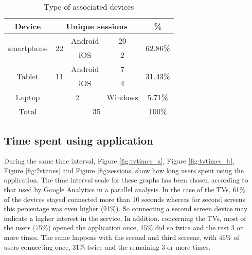 \begin{table}
	\begin{center}
		\caption{Type of associated devices}\label{tab:associated}
		\begin{tabular}{||c|c|c|c|c||}
			\hline
			\multicolumn{1}{||c|}{Device}                      & \multicolumn{3}{c|}{Unique sessions} & \%                       \\ \hline\hline
			\multicolumn{1}{||c|}{\multirow{2}{*}{smartphone}} & \multirow{2}{*}{22}    & Android   & 20        & \multirow{2}{*}{62.86\%} \\ \cline{3-4}
			\multicolumn{1}{||c|}{}                            &                        & iOS       & 2         &                          \\ \hline
			\multirow{2}{*}{Tablet}                           & \multirow{2}{*}{11}    & Android   & 7         & \multirow{2}{*}{31.43\%} \\ \cline{3-4} 
			\multicolumn{1}{||c|}{} 			&          
			& iOS       & 4         &   \\ \hline
			Laptop                                            & \multicolumn{2}{c|}{2}             & Windows   & 5.71\%                   \\ \hline
			Total                                             & \multicolumn{3}{c|}{35}                        & 100\%                    \\ \hline
		\end{tabular}
	\end{center}
\end{table}

\subsection{Time spent using application}\label{timeres}
During the same time interval, Figure \ref{fig:tvtimes_a}, Figure \ref{fig:tvtimes_b}, Figure \ref{fig:2stimes} and Figure \ref{fig:sessions} show how long users spent using the application. The time interval scale for these graphs has been chosen according to that used by Google Analytics \cite{analytics} in a parallel analysis. In the case of the TVs, 61\% of the devices stayed connected more than 10 seconds whereas for second screens this percentage was even higher (91\%). So connecting a second screen device may indicate a higher interest in the service. In addition, concerning the TVs, most of the users (75\%) opened the application once, 15\% did so twice and the rest 3 or more times. The same happens with the second and third screens, with 46\% of users connecting once, 31\% twice and the remaining 3 or more times.  

